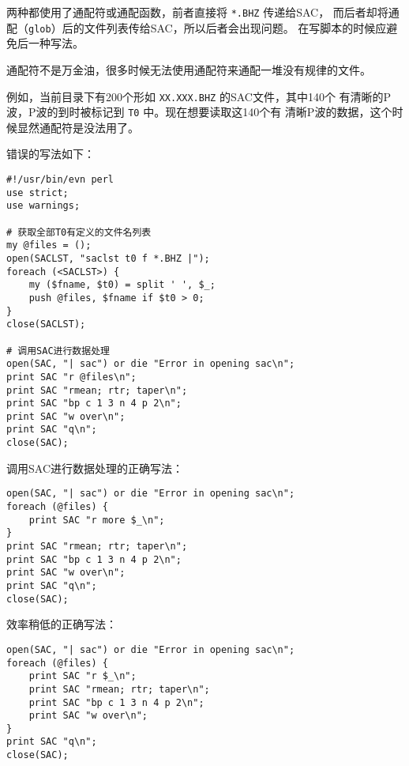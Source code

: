 两种都使用了通配符或通配函数，前者直接将 \texttt{*.BHZ} 传递给SAC，
而后者却将通配（\texttt{glob}）后的文件列表传给SAC，所以后者会出现问题。
在写脚本的时候应避免后一种写法。

通配符不是万金油，很多时候无法使用通配符来通配一堆没有规律的文件。

例如，当前目录下有200个形如 \texttt{XX.XXX.BHZ} 的SAC文件，其中140个
有清晰的P波，P波的到时被标记到 \texttt{T0} 中。现在想要读取这140个有
清晰P波的数据，这个时候显然通配符是没法用了。

错误的写法如下：
\begin{verbatim}
#!/usr/bin/evn perl
use strict;
use warnings;

# 获取全部T0有定义的文件名列表
my @files = ();
open(SACLST, "saclst t0 f *.BHZ |");
foreach (<SACLST>) {
    my ($fname, $t0) = split ' ', $_;
    push @files, $fname if $t0 > 0;
}
close(SACLST);

# 调用SAC进行数据处理
open(SAC, "| sac") or die "Error in opening sac\n";
print SAC "r @files\n";
print SAC "rmean; rtr; taper\n";
print SAC "bp c 1 3 n 4 p 2\n";
print SAC "w over\n";
print SAC "q\n";
close(SAC);
\end{verbatim}

调用SAC进行数据处理的正确写法：
\begin{verbatim}
open(SAC, "| sac") or die "Error in opening sac\n";
foreach (@files) {
    print SAC "r more $_\n";
}
print SAC "rmean; rtr; taper\n";
print SAC "bp c 1 3 n 4 p 2\n";
print SAC "w over\n";
print SAC "q\n";
close(SAC);
\end{verbatim}

效率稍低的正确写法：
\begin{verbatim}
open(SAC, "| sac") or die "Error in opening sac\n";
foreach (@files) {
    print SAC "r $_\n";
    print SAC "rmean; rtr; taper\n";
    print SAC "bp c 1 3 n 4 p 2\n";
    print SAC "w over\n";
}
print SAC "q\n";
close(SAC);
\end{verbatim}
